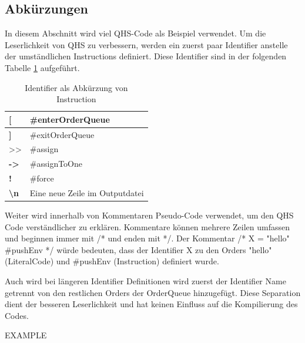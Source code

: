 \subsection{Abkürzungen}
In diesem Abschnitt wird viel QHS-Code als Beispiel verwendet.
Um die Leserlichkeit von QHS zu verbessern, werden ein zuerst paar Identifier anstelle der umständlichen Instructions definiert.
Diese Identifier sind in der folgenden Tabelle \ref{tab:shortcuts} aufgeführt.

{
\begin{table}[H]
    \centering
    \caption{Identifier als Abkürzung von Instruction}
    \vspace{3mm} %
    \label{tab:shortcuts}
    
    \begin{tabular}{>{\listingFont\selectfont}l|l}
    \textbf{{[}}                 & \#enterOrderQueue              \\ \hline
    \textbf{{]}}                 & \#exitOrderQueue               \\ \hline
    \textgreater{}\textgreater{} & \#assign                       \\ \hline
    \textbf{-\textgreater{}}     & \#assignToOne                  \\ \hline
    \textbf{!}                   & \#force                        \\ \hline
    \textbf{\textbackslash{}n}   & Eine neue Zeile im Outputdatei
    \end{tabular}
\end{table}
}

Weiter wird innerhalb von Kommentaren Pseudo-Code verwendet, um den QHS Code verständlicher zu erklären. Kommentare können mehrere Zeilen umfassen und beginnen immer mit /* und enden mit */.
Der Kommentar /* X = "hello" \#pushEnv */ würde bedeuten, dass der Identifier X zu den Orders "hello" (LiteralCode) und \#pushEnv (Instruction) definiert wurde. 

Auch wird bei längeren Identifier Definitionen wird zuerst der Identifier Name getrennt von den restlichen Orders der OrderQueue hinzugefügt.
Diese Separation dient der besseren Leserlichkeit und hat keinen Einfluss auf die Kompilierung des Codes.

EXAMPLE


